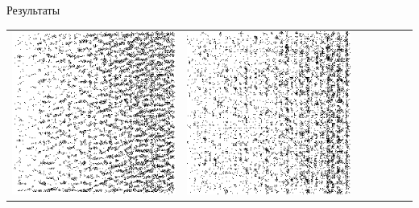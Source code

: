 \documentclass[12pt]{beamer}
\begin{document}
\begin{frame}{Результаты}
\begin{table}
\begin{center}
\begin{tabular}{p{1.2cm} p{1.2cm} p{1.2cm} p{1.2cm} p{1.2cm} p{1.2cm} p{1.2cm}}
					\includegraphics[width=1\linewidth]{8-results/sand-trend8/nf64e5/gen2}
					&
					\includegraphics[width=1\linewidth]{8-results/sand-trend8/nf64e10/gen2}
					\\

\end{tabular}
\end{center}
\end{table}
\end{frame}
\end{document}

